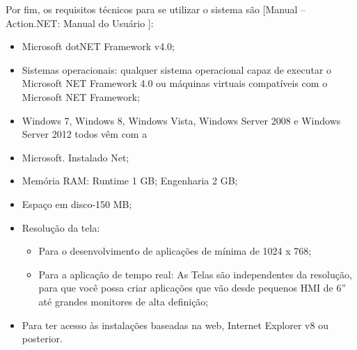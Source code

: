 Por fim, os requisitos técnicos para se utilizar o sistema são [Manual – Action.NET: Manual do Usuário ]:
\begin{itemize}
\item Microsoft dotNET Framework v4.0;
\item Sistemas operacionais: qualquer sistema operacional capaz de executar o Microsoft NET Framework 4.0 ou máquinas virtuais compatíveis com o Microsoft NET Framework;
\item Windows 7, Windows 8, Windows Vista, Windows Server 2008 e Windows Server 2012 todos vêm com a \item Microsoft. Instalado Net;
\item Memória RAM: Runtime 1 GB; Engenharia 2 GB;
\item Espaço em disco-150 MB;
\item Resolução da tela:
	\begin{itemize}
	\item Para o desenvolvimento de aplicações de mínima de 1024 x 768;
	\item Para a aplicação de tempo real: As Telas são independentes da resolução, para que você possa criar aplicações que vão desde pequenos HMI de 6” até grandes monitores de alta definição;
	\end{itemize}
\item Para ter acesso às instalações baseadas na web, Internet Explorer v8 ou posterior.
\end{itemize}
